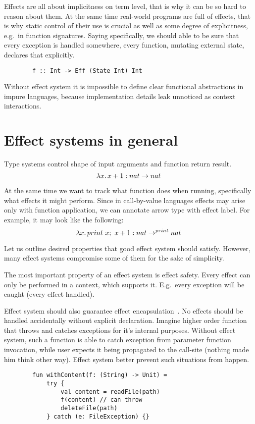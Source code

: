 \documentclass[conference]{IEEEtran}
\newcommand{\seq}{;~}
\newcommand{\ap}{~}
\begin{document}



    Effects are all about implicitness on term level, that is why it can be so hard to reason about them.
    At the same time real-world programs are full of effects, that is why static control of their use is crucial as well as some degree of explicitness, e.g.\ in function signatures.
    Saying specifically, we should able to be sure that every exception is handled somewhere, every function, mutating external state, declares that explicitly.

    \begin{verbatim}
        f :: Int -> Eff (State Int) Int
    \end{verbatim}

    Without effect system it is impossible to define clear functional abstractions in impure languages, because implementation details leak unnoticed as context interactions.


    \section{Effect systems in general}

    Type systems control shape of input arguments and function return result.
    \[\lambda x\ldotp x + 1 : nat\to nat\]

    At the same time we want to track what function does when running, specifically what effects it might perform.
    Since in call-by-value languages effects may arise only with function application, we can annotate arrow type with effect label.
    For example, it may look like the following:
    \[\lambda x\ldotp print \ap x\seq x + 1 : nat\to^{print} nat\]

    Let us outline desired properties that good effect system should satisfy.
    However, many effect systems compromise some of them for the sake of simplicity.

    The most important property of an effect system is effect safety.
    Every effect can only be performed in a context, which supports it.
    E.g.\ every exception will be caught (every effect handled).

    Effect system should also guarantee effect encapsulation~\cite{encapsulation}.
    No effects should be handled accidentally without explicit declaration.
    Imagine higher order function that throws and catches exceptions for it's internal purposes.
    Without effect system, such a function is able to catch exception from parameter function invocation, while user expects it being propagated to the call-site (nothing made him think other way).
    Effect system better prevent such situations from happen.
    \begin{verbatim}
        fun withContent(f: (String) -> Unit) =
            try {
                val content = readFile(path)
                f(content) // can throw
                deleteFile(path)
            } catch (e: FileException) {}
    \end{verbatim}
\end{document}

